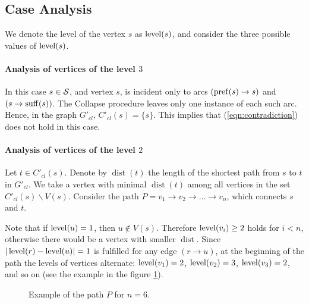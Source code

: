 \subsection{Case Analysis}
\label{sec:proof2}
We denote the level of the vertex $ s $ as $ \operatorname{level} (s) $, and consider the three possible values of $\operatorname{level}(s)$.


\paragraph{Analysis of vertices of the level \texorpdfstring{$3$}{3}}

In this case $ s \in {\cal S} $, and vertex $ s $, is incident only to arcs $ (\operatorname{pref} (s) \to s)$ and $(s \to \operatorname{suff} (s)) $. The Collapse procedure leaves only one instance of each such arc. Hence, in the graph $ G'_{cl} $, $ C'_{cl} (s) = \{s \} $. This implies that (\ref{eqn:contradiction}) does not hold in this case.

\paragraph{Analysis of vertices of the level \texorpdfstring{$2$}{2}}

Let $ t \in C'_{cl} (s) $. Denote by $ \operatorname{dist} (t) $ the length of the shortest path from $ s $ to $ t $ in $ G'_{cl} $. We take a vertex with minimal $ \operatorname{dist} (t) $ among all vertices in the set $ C'_{cl} (s) \backslash V (s) $. Consider the path $ P = v_1 \to v_2 \to \ldots \to v_n $, which connects $ s $ and $ t $.

Note that if $ \operatorname{level} (u) = 1 $, then $ u \notin V (s) $. Therefore $ \operatorname{level} (v_i) \ge 2 $ holds for $ i<n $, otherwise there would be a vertex with smaller $ \operatorname {dist} $. Since $ | \operatorname{level} (r) - \operatorname{level} (u) | = 1 $ is fulfilled for any edge $ (r \to u) $, at the beginning of the path the levels of vertices alternate: $ \operatorname{level} (v_1) = 2 $, $ \operatorname{level} (v_2) = 3 $, $ \operatorname{level} (v_3) = 2 $, and so on (see the example in the figure \ref{fig:lvl2path6}).

\begin{figure}[ht]
\begin{center}

\end{center}

\caption{Example of the path $P$ for $n=6$.}\label{fig:lvl2path6}
\end{figure}


